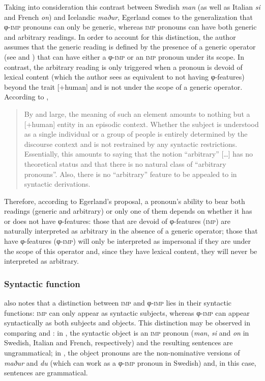 \documentclass[output=paper]{langscibook}
\begin{document}
Taking into consideration this contrast between Swedish \textit{man} {(as well as Italian} {\textit{si} }{and French} {\textit{on}}{) and Icelandic} {\textit{maður}}, Egerland comes to the generalization that φ-\textsc{imp} pronouns can only be generic, whereas \textsc{imp} pronouns can have both generic and arbitrary readings. In order to account for this distinction, the author assumes that the generic reading is defined by the presence of a generic operator (see \citealt{KrifkaEtAl1995} and \citealt{Chierchia1995}) that can have either a φ-\textsc{imp} or an \textsc{imp} pronoun under its scope. In contrast, the arbitrary reading is only triggered when a pronoun is devoid of lexical content (which the author sees as equivalent to not having φ-fea\-tures) beyond the trait [+human] and is not under the scope of a generic operator. According to \citet[89]{Egerland2003},

\begin{quote}
By and large, the meaning of such an element amounts to nothing but a [+human] entity in an episodic context. Whether the subject is understood as a single individual or a group of people is entirely determined by the discourse context and is not restrained by any syntactic restrictions. Essentially, this amounts to saying that the notion “arbitrary” […] has no theoretical status and that there is no natural class of “arbitrary pronouns”. Also, there is no “arbitrary” feature to be appealed to in syntactic derivations.
\end{quote}

{Therefore, according to Egerland’s proposal, a pronoun’s ability to bear both readings (generic and arbitrary) or only one of them depends on whether it has or does not have φ-fea\-tures: those that are devoid of φ-fea\-tures (\textsc{imp}) are naturally interpreted as arbitrary in the absence of a generic operator; those that have φ-fea\-tures (φ-\textsc{imp}) will only be interpreted as impersonal if they are under the scope of this operator and, since they have lexical content, they will never be interpreted as arbitrary.}

\subsubsection{Syntactic function}

\citet{Egerland2003} also notes that a distinction between \textsc{imp} and φ-\textsc{imp} lies in their syntactic functions: \textsc{imp} can only appear as syntactic subjects, whereas φ-\textsc{imp} can appear syntactically as both subjects and objects. This distinction may be observed in comparing  and : in , the syntactic object is an \textsc{imp} pronoun ({\textit{man}}, {\textit{si} }{and} {\textit{on} }{in Swedish, Italian and French, respectively) and the resulting sentences are ungrammatical; in , the object pronouns are the non-nominative} {versions of} {\textit{maður} }{and} {\textit{du}} {(which can work as a φ-\textsc{imp} pronoun in Swedish) and, in this case, sentences are grammatical.}
\end{document}

